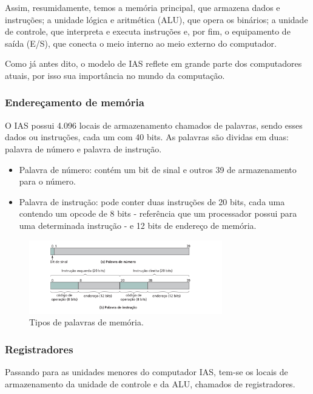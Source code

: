 \documentclass{article}
\begin{document}
Assim, resumidamente, temos a memória principal, que armazena dados e
instruções; a unidade lógica e aritmética (ALU), que opera os binários; a
unidade de controle, que interpreta e executa instruções e, por fim, o
equipamento de saída (E/S), que conecta o meio interno ao meio externo do
computador.

Como já antes dito, o modelo de IAS reflete em grande parte dos computadores
atuais, por isso sua importância no mundo da computação.

\subsubsection{Endereçamento de memória}
O IAS possui 4.096 locais de armazenamento chamados de palavras, sendo esses
dados ou instruções, cada um com 40 bits. As palavras são dividas em duas:
palavra de número e palavra de instrução.

\begin{itemize}
        \item Palavra de número: contém um bit de sinal e outros 39 de
            armazenamento para o número. 
        \item Palavra de instrução: pode conter duas instruções de 20 bits,
            cada uma contendo um opcode de 8 bits - referência que um
            processador possui para uma determinada instrução - e 12 bits de
            endereço de memória.
\end{itemize}

\begin{figure}[H]
   \centering
   \includegraphics[width=0.75\textwidth]{palavras.png}
   \caption{Tipos de palavras de memória.}
\end{figure}

\subsubsection{Registradores}
Passando para as unidades menores do computador IAS, tem-se os locais de
armazenamento da unidade de controle e da ALU, chamados de registradores.
\end{document}

